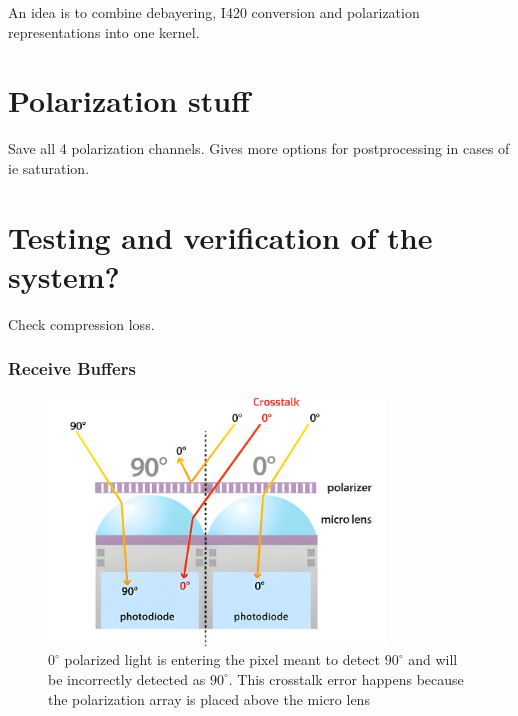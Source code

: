 An idea is to combine debayering, I420 conversion and polarization representations into one kernel.

\section{Polarization stuff}
Save all 4 polarization channels.
Gives more options for postprocessing in cases of ie saturation.

\section{Testing and verification of the system?}
Check compression loss.

\subsubsection{Receive Buffers}
\begin{figure}
    \centering
    \includegraphics[width=0.8\textwidth]{figures/crosstalk_upscaled.jpg}
    \caption{$0^{\circ}$ polarized light is entering the pixel meant to detect $90^{\circ}$ and will be incorrectly detected as $90^{\circ}$.  This crosstalk error happens because the polarization array is placed above the micro lens \cite{lucidvisionlabsPolarizationExplainedSony2018}}
    \label{fig:camera_crosstalk}
\end{figure}

